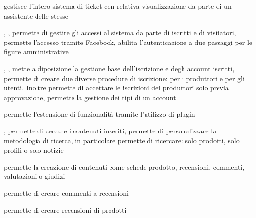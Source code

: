 
{}
{ gestisce l'intero sistema di ticket con relativa visualizzazione da parte di un assistente delle stesse}


{, , }
{ permette di gestire gli accessi al sistema da parte di iscritti e di visitatori,  permette l'accesso tramite Facebook,  abilita l'autenticazione a due passaggi per le figure amministrative}


{, , }
{ mette a diposizione la gestione base dell'iscrizione e degli account iscritti,   permette di creare due diverse procedure di iscrizione: per i produttori e per gli utenti. Inoltre permette di accettare le iscrizioni dei produttori solo previa approvazione,  permette la gestione dei tipi di un account}


{}
{ permette l'estensione di funzionalità tramite l'utilizzo di plugin}


{, }
{ permette di cercare i contenuti inseriti,  permette di personalizzare la metodologia di ricerca, in particolare permette di ricercare: solo prodotti, solo profili o solo notizie}


{}
{ permette la creazione di contenuti come schede prodotto, recensioni, commenti, valutazioni o giudizi}


{}
{ permette di creare commenti a recensioni}


{}
{ permette di creare recensioni di prodotti}


